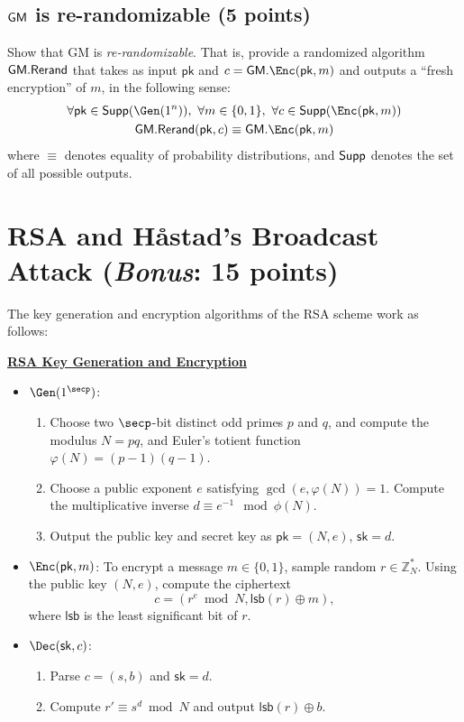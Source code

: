 \documentclass{article}
\newcommand{\proto}[2]{
    \stepcounter{figure}
    \vspace{0.05cm}
    { \small
    \begin{tcolorbox}[breakable]
        \begin{center}
            {\bf \underline{#1}}
        \end{center}
        #2
    \end{tcolorbox} }
}
\newcommand{\pk}{\mathsf{pk}}
\newcommand{\sk}{\mathsf{sk}}
\begin{document}
\subsection{$\mathsf{GM}$ is re-randomizable (5 points)}
Show that GM is \emph{re-randomizable}. That is, provide a randomized algorithm $\mathsf{GM}.\mathsf{Rerand}$ that takes as input $\pk$ and $c = \GM.\Enc(\pk, m)$ and outputs a ``fresh encryption'' of $m$, in the following sense:
    \begin{gather}\label{def:rerandomizable}
    \forall \pk \in \supp(\Gen(1^n)),\ \forall m \in \{0, 1\},\ 
    \forall c \in  \supp(\Enc(\pk, m)) \notag \\ \GM.\Rerand(\pk, c) \equiv \GM.\Enc(\pk, m)
    \end{gather}
    where $\equiv$ denotes equality of probability distributions, and $\mathsf{Supp}$ denotes the set of all possible outputs.

\newpage
\section{RSA and H\r{a}stad's Broadcast Attack (\emph{Bonus}: 15 points)}

The key generation and encryption algorithms of the RSA scheme work as follows:
\proto{RSA Key Generation and Encryption}{
\begin{itemize}
    \item $\Gen(1^{\secp})$:
    \begin{enumerate}
        \item Choose two $\secp$-bit distinct odd primes $p$ and $q$, and compute the modulus $N = pq$, and Euler's totient function $\varphi(N) = (p-1)(q-1)$.
        \item Choose a public exponent $e$ satisfying $\gcd(e, \varphi(N)) = 1$. Compute the multiplicative inverse $d \equiv e^{-1} \mod \phi(N)$.
        \item Output the public key and secret key as $\pk = (N, e)$, $\sk = d$.
    \end{enumerate}
    \item $\Enc(\pk, m)$: To encrypt a message $m \in \{0,1\}$, sample random $r \in \mathbb{Z}_N^*$. Using the public key $(N, e)$, compute the ciphertext
        \[ c = ( r^e \bmod{N}, \mathsf{lsb}(r) \oplus m ),\]
    where $\mathsf{lsb}$ is the least significant bit of $r$.
    \item $\Dec(\sk, c)$: 
    \begin{enumerate}
        \item Parse $ c = (s, b)$ and $\sk = d$.
        \item Compute $r ' \equiv s^{d} \bmod N$ and output $\mathsf{lsb}(r) \oplus b$.
    \end{enumerate}
\end{itemize}
}
\end{document}
